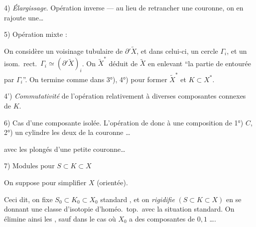 \documentclass[11pt,a4paper]{article}
\begin{document}
4) \emph{Élargissage}. Opération inverse — au lieu de retrancher une
couronne, on en rajoute une…

5) Opération mixte : \emph{\ill{}}

On considère un voisinage tubulaire  \ill{} de
$\partial'\widetilde{X}$, et dans celui-ci, un cercle $\Gamma_{i}$, et un
isom.\ rect.\ $\Gamma_{i} \simeq (\partial'\widetilde{X})_{i}$. On
\struck{\ill{}}  \struck{\ill{}} 
$\widetilde{X}^{*}$ déduit de $\widetilde{X}$ en enlevant 
“la \struck{\ill{}} partie de  entourée par $\Gamma_{i}$”.
On termine comme dans 3°), 4°) pour former $\widetilde{X}^{*}$ et
$K \subset X^{*}$.



4') \emph{Commutativité} de l'opération \ill{} relativement à diverses
composantes connexes de $K$.

6) Cas d'une composante   isolée. L'opération de \ill{} 
donc à une composition de 1°) \ill{} 
 $C$, 2°) 
 un cylindre les deux 
 de la couronne …


 avec les \struck{\ill{}} \ill{} plongés  d'une petite couronne…

7) Modules pour $S \subset K \subset X$

On suppose  pour simplifier $X$ 
 (orientée).

Ceci dit, on fixe $S_{0} \subset K_{0} \subset X_{0}$ standard
, et on \emph{rigidifie} $(S \subset K \subset X)$ en se
donnant une classe d'isotopie d'homéo.\ top.\ avec la situation standard. On
élimine ainsi les , sauf dans le cas
\struck{\ill{}} où $X_{0}$ a des composantes de  $0, 1$ ….
\end{document}
